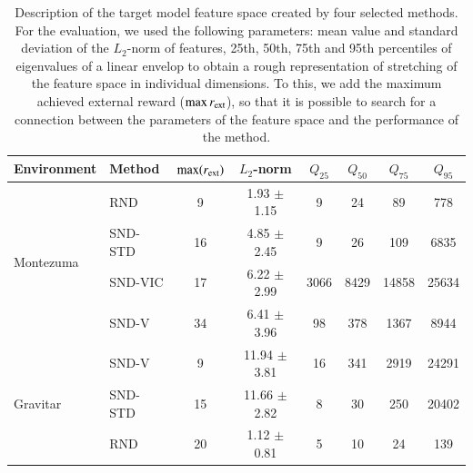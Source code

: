\documentclass[a4paper,11pt]{elsarticle}
\begin{document}
\begin{table}[t!]
\scriptsize
\centering
\caption{Description of the target model feature space created by four selected methods. For the evaluation, we used the following parameters: mean value and standard deviation of the $L_{2}$-norm of features, 25th, 50th, 75th and 95th percentiles of eigenvalues of a linear envelop to obtain a rough representation of stretching of the feature space in individual dimensions. To this, we add the maximum achieved external reward ($\max{r_{\rm ext}}$), so that it is possible to search for a connection between the parameters of the feature space and the performance of the method.}
\begin{tabular}{l|l|cccccc}
\hline
 Environment & Method & $\max({r_{\rm ext}})$ & $L_2$-norm & $Q_{25}$ & $Q_{50}$ & $Q_{75}$ & $Q_{95}$ \\
\hline\hline
\multirow{4}{*}{Montezuma}
& \multicolumn{1}{l|}{RND} & \multicolumn{1}{c}{9} & \multicolumn{1}{c}{1.93 $\pm$ 1.15} & \multicolumn{1}{c}{9} & \multicolumn{1}{c}{24} & \multicolumn{1}{c}{89} & \multicolumn{1}{c}{778} \\
& \multicolumn{1}{l|}{SND-STD} & \multicolumn{1}{c}{16} & \multicolumn{1}{c}{4.85 $\pm$ 2.45} & \multicolumn{1}{c}{9} & \multicolumn{1}{c}{26} & \multicolumn{1}{c}{109} & \multicolumn{1}{c}{6835} \\
& \multicolumn{1}{l|}{SND-VIC} & \multicolumn{1}{c}{17} & \multicolumn{1}{c}{6.22 $\pm$ 2.99} & \multicolumn{1}{c}{3066} & \multicolumn{1}{c}{8429} & \multicolumn{1}{c}{14858} & \multicolumn{1}{c}{25634} \\
& \multicolumn{1}{l|}{SND-V} & \multicolumn{1}{c}{34} & \multicolumn{1}{c}{6.41 $\pm$ 3.96} & \multicolumn{1}{c}{98} & \multicolumn{1}{c}{378} & \multicolumn{1}{c}{1367} & \multicolumn{1}{c}{8944} \\
\hline%
\multirow{4}{*}{Gravitar}
& \multicolumn{1}{l|}{SND-V} & \multicolumn{1}{c}{9} & \multicolumn{1}{c}{11.94 $\pm$ 3.81} & \multicolumn{1}{c}{16} & \multicolumn{1}{c}{341} & \multicolumn{1}{c}{2919} & \multicolumn{1}{c}{24291} \\
& \multicolumn{1}{l|}{SND-STD} & \multicolumn{1}{c}{15} & \multicolumn{1}{c}{11.66 $\pm$ 2.82} & \multicolumn{1}{c}{8} & \multicolumn{1}{c}{30} & \multicolumn{1}{c}{250} & \multicolumn{1}{c}{20402} \\
& \multicolumn{1}{l|}{RND} & \multicolumn{1}{c}{20} & \multicolumn{1}{c}{1.12 $\pm$ 0.81} & \multicolumn{1}{c}{5} & \multicolumn{1}{c}{10} & \multicolumn{1}{c}{24} & \multicolumn{1}{c}{139} \\

\end{tabular}
\end{table}
\end{document}
